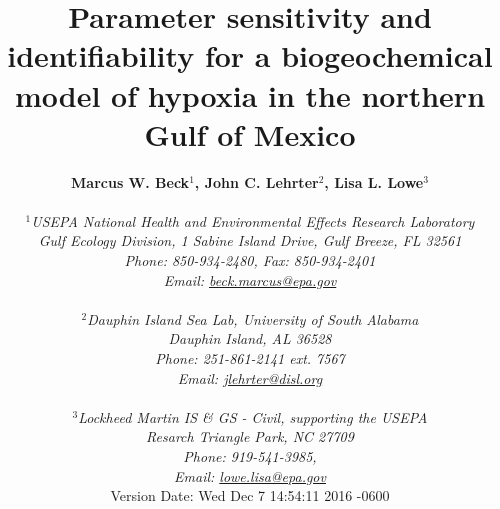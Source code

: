\documentclass[letterpaper,12pt,oneside]{article}\usepackage[]{graphicx}\usepackage[]{color}
\begin{document}
\raggedbottom
\linenumbers
\raggedright
{}
\setlength{\parindent}{0.5in}
\renewcommand\refname{References \vspace{12pt}}

\begin{singlespace}
\title{{\bf {\Large Parameter sensitivity and identifiability for a biogeochemical model of hypoxia in the northern {G}ulf of {M}exico}}}
\author{
  {\bf {\normalsize Marcus W. Beck$^1$, John C. Lehrter$^2$, Lisa L. Lowe$^3$}}
  \\\\{\textit {\normalsize $^1$USEPA National Health and Environmental Effects Research Laboratory}}
  \\{\textit {\normalsize Gulf Ecology Division, 1 Sabine Island Drive, Gulf Breeze, FL 32561}}
	\\{\textit {\normalsize Phone: 850-934-2480, Fax: 850-934-2401}}
	\\{\textit {\normalsize Email: \href{mailto:beck.marcus@epa.gov}{beck.marcus@epa.gov}}}
	  \\\\{\textit {\normalsize $^2$Dauphin Island Sea Lab, University of South Alabama}}
  \\{\textit {\normalsize Dauphin Island, AL 36528}}
	\\{\textit {\normalsize Phone: 251-861-2141 ext. 7567}}
	\\{\textit {\normalsize Email: \href{mailto:jlehrter@disl.org}{jlehrter@disl.org}}}
	\\\\{\textit {\normalsize $^3$Lockheed Martin IS \& GS - Civil, supporting the USEPA}}
	\\{\textit {\normalsize Resarch Triangle Park, NC 27709}}
	\\{\textit {\normalsize Phone: 919-541-3985,}}
	\\{\textit {\normalsize Email: \href{mailto:lowe.lisa@epa.gov}{lowe.lisa@epa.gov}}}
  \vspace{1in} 
  \\ Version Date:   Wed Dec 7 14:54:11 2016 -0600
	}
\date{}
\maketitle
\end{singlespace}
\clearpage
\end{document}
